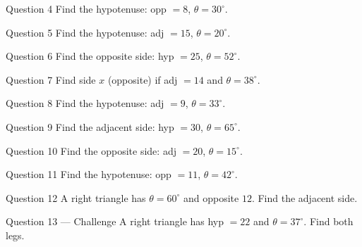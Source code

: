 \documentclass[11pt]{article}
\begin{document}
\begin{qbox}{Question 4}
Find the hypotenuse: opp $=8$, $\theta=30^\circ$.\workspace{2.0cm}
\end{qbox}

\begin{qbox}{Question 5}
Find the hypotenuse: adj $=15$, $\theta=20^\circ$.\workspace{2.2cm}
\end{qbox}

\begin{qbox}{Question 6}
Find the opposite side: hyp $=25$, $\theta=52^\circ$.\workspace{2.0cm}
\end{qbox}

\begin{qbox}{Question 7}
Find side $x$ (opposite) if adj $=14$ and $\theta=38^\circ$.\workspace{2.0cm}
\end{qbox}

\begin{qbox}{Question 8}
Find the hypotenuse: adj $=9$, $\theta=33^\circ$.\workspace{2.2cm}
\end{qbox}

\begin{qbox}{Question 9}
Find the adjacent side: hyp $=30$, $\theta=65^\circ$.\workspace{2.0cm}
\end{qbox}

\begin{qbox}{Question 10}
Find the opposite side: adj $=20$, $\theta=15^\circ$.\workspace{2.0cm}
\end{qbox}

\begin{qbox}{Question 11}
Find the hypotenuse: opp $=11$, $\theta=42^\circ$.\workspace{2.2cm}
\end{qbox}

\begin{qbox}{Question 12}
A right triangle has $\theta=60^\circ$ and opposite $12$. Find the adjacent side.\workspace{2.2cm}
\end{qbox}

\begin{qbox}{Question 13 --- Challenge}
A right triangle has hyp $=22$ and $\theta=37^\circ$. Find both legs.\workspace{2.8cm}
\end{qbox}

\clearpage
{}
\end{document}
